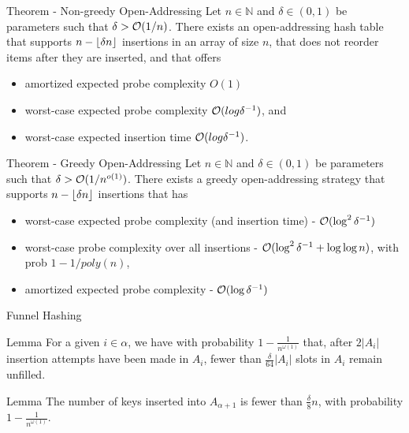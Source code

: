 \documentclass{beamer}
\begin{document}
\begin{frame}
	\begin{block}{Theorem - Non-greedy Open-Addressing}
	Let $n \in \mathbb{N}$ and $\delta \in(0, 1)$ be parameters such that $\delta > 
	{\cal O}(1/n)$. There exists an open-addressing hash table that supports $n - \left\lfloor \delta n \right\rfloor$ insertions in an array of size $n$, that does not reorder items after they are inserted, and that oﬀers
	\begin{itemize}
		\item amortized expected probe complexity $O(1)$
		\item worst-case expected probe complexity ${\cal O}(log \delta^{-1})$, and
		\item worst-case expected
		insertion time ${\cal O}(log \delta^{-1})$.
	\end{itemize}
	\end{block}
\end{frame}

\begin{frame}
	\begin{block}{Theorem - Greedy Open-Addressing}
		Let $n \in \mathbb{N}$ and $\delta \in(0, 1)$ be parameters such that $\delta > 
		{\cal O}(1/n^{o(1)})$.
			 There exists a greedy open-addressing strategy that supports $n - \left\lfloor \delta n \right\rfloor$ insertions that has 
			\begin{itemize}
				\item worst-case expected probe complexity (and insertion time) - ${\cal O}(\log^2{\delta^{-1}} )$ 
				\item worst-case probe complexity over all insertions - ${\cal O}(\log^2{\delta^{-1}} + \log{\log{n}})$, with prob $1- 1/poly(n)$, 
				\item amortized expected probe complexity - ${\cal O}(\log{\delta^{-1}})$
			\end{itemize}
		
	\end{block}
\end{frame}

\begin{frame}{Funnel Hashing}
	\begin{figure}
		
	\end{figure}
\end{frame}

\begin{frame}
	\begin{block}{Lemma}
		For a given $i \in \alpha$, we have with probability $1 - \frac{1}{n^{\omega(1)}}$ that, after $2|A_i|$ insertion attempts have been made in $A_i$, fewer than $\frac{\delta}{64} |A_i|$ slots in $A_i$ remain unfilled.
	\end{block}

	\begin{block}{Lemma}
		The number of keys inserted into $A_{\alpha + 1}$ is fewer than $\frac{\delta}{8}n$, with probability $1 - \frac{1}{n^{\omega(1)}}$.
	\end{block}

\end{frame}
\end{document}
